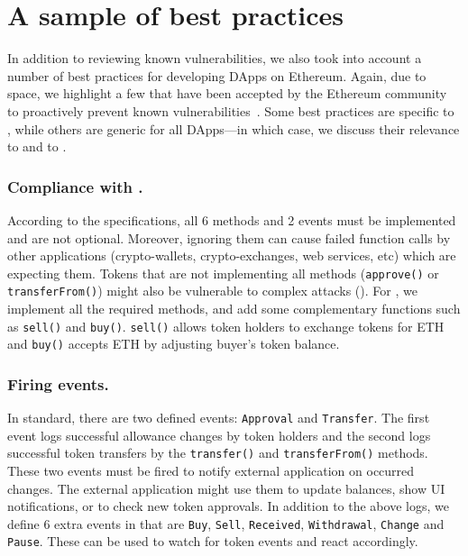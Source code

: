 
\section{A sample of best practices}\label{section:bp}

In addition to reviewing known vulnerabilities, we also took into account a number of best practices for developing DApps on Ethereum. Again, due to space, we highlight a few that have been accepted by the Ethereum community to proactively prevent known vulnerabilities~\cite{TokenBP}. Some best practices are specific to \erc, while others are generic for all DApps---in which case, we discuss their relevance to \erc and to \sys.

\subsubsection{Compliance with \erc.}

According to the \erc specifications, all 6 methods and 2 events must be implemented and are not optional. Moreover, ignoring them can cause failed function calls by other applications (\ie crypto-wallets, crypto-exchanges, web services, etc) which are expecting them. Tokens that are not implementing all methods (\eg \texttt{approve()} or \texttt{transferFrom()}) might also be vulnerable to complex attacks (\cf \cite{DEPOSafe}). For \sys, we implement all the required methods, and add some complementary functions such as \texttt{sell()} and \texttt{buy()}. \texttt{sell()} allows token holders to exchange tokens for ETH and \texttt{buy()} accepts ETH by adjusting buyer's token balance.

\subsubsection{Firing events.}

In \erc standard, there are two defined events: \texttt{Approval} and \texttt{Transfer}. The first event logs successful allowance changes by token holders and the second logs successful token transfers by the \texttt{transfer()} and \texttt{transferFrom()} methods. These two events must be fired to notify external application on occurred changes. The external application might use them to update balances, show UI notifications, or to check new token approvals. In addition to the above logs, we define 6 extra events in \sys that are \texttt{Buy}, \texttt{Sell}, \texttt{Received}, \texttt{Withdrawal}, \texttt{Change} and \texttt{Pause}. These can be used to watch for token events and react accordingly.

